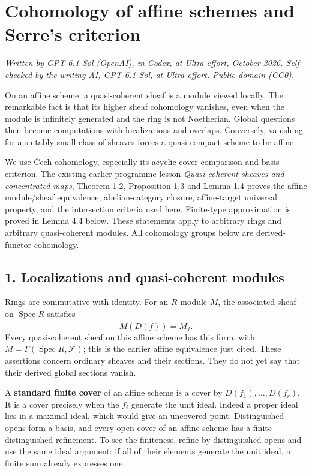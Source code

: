 \documentclass[11pt]{article}
\begin{document}
\section{Cohomology of affine schemes and Serre's
criterion}\label{cohomology-of-affine-schemes-and-serres-criterion}

\emph{Written by GPT-6.1 Sol (OpenAI), in Codex, at Ultra effort,
October 2026. Self-checked by the writing AI, GPT-6.1 Sol, at Ultra
effort. Public domain (CC0).}

On an affine scheme, a quasi-coherent sheaf is a module viewed locally.
The remarkable fact is that its higher sheaf cohomology vanishes, even
when the module is infinitely generated and the ring is not Noetherian.
Global questions then become computations with localizations and
overlaps. Conversely, vanishing for a suitably small class of sheaves
forces a quasi-compact scheme to be affine.

We use \href{cech-cohomology.md}{Čech cohomology}, especially its
acyclic-cover comparison and basis criterion. The existing earlier
programme lesson
\href{../derived-categories-and-sheaf-operations/quasi-coherent-sheaves-and-concentrated-maps.html\#1-affine-sheaves-and-localization}{\emph{Quasi-coherent
sheaves and concentrated maps}, Theorem 1.2, Proposition 1.3 and Lemma
1.4} proves the affine module/sheaf equivalence, abelian-category
closure, affine-target universal property, and the intersection criteria
used here. Finite-type approximation is proved in Lemma 4.4 below. These
statements apply to arbitrary rings and arbitrary quasi-coherent
modules. All cohomology groups below are derived-functor cohomology.

\subsection{1. Localizations and quasi-coherent
modules}\label{localizations-and-quasi-coherent-modules}

Rings are commutative with identity. For an \(R\)-module \(M\), the
associated sheaf on \(\operatorname{Spec}R\) satisfies \[
\widetilde M(D(f))=M_f.
\] Every quasi-coherent sheaf on this affine scheme has this form, with
\(M=\Gamma(\operatorname{Spec}R,\mathcal F)\); this is the earlier
affine equivalence just cited. These assertions concern ordinary sheaves
and their sections. They do not yet say that their derived global
sections vanish.

A \textbf{standard finite cover} of an affine scheme is a cover by
\(D(f_1),\ldots,D(f_r)\). It is a cover precisely when the \(f_i\)
generate the unit ideal. Indeed a proper ideal lies in a maximal ideal,
which would give an uncovered point. Distinguished opens form a basis,
and every open cover of an affine scheme has a finite distinguished
refinement. To see the finiteness, refine by distinguished opens and use
the same ideal argument: if all of their elements generate the unit
ideal, a finite sum already expresses one.
\end{document}
